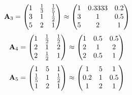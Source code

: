 \documentclass[10pt,a4paper]{article}
\begin{document}
	\[
		\bold{A}_{3} = 
		\begin{pmatrix}
			{1} {} & \frac{1} {{3}} & \frac{1} {{5}} \\
			{{3}} {} & {1} {} & \frac{1} {{2}} \\
			{{5}} {} & {{2}} {} & {1} {} \\
		\end{pmatrix}
		\approx
		\begin{pmatrix}
			1        & 0.3333   & 0.2      \\
			3        & 1        & 0.5      \\
			5        & 2        & 1        \\
		\end{pmatrix}
	\]
	\[
		\bold{A}_{4} = 
		\begin{pmatrix}
			{1} {} & \frac{1} {{2}} & \frac{1} {{2}} \\
			{{2}} {} & {1} {} & {{2}} {} \\
			{{2}} {} & \frac{1} {{2}} & {1} {} \\
		\end{pmatrix}
		\approx
		\begin{pmatrix}
			1        & 0.5      & 0.5      \\
			2        & 1        & 2        \\
			2        & 0.5      & 1        \\
		\end{pmatrix}
	\]
	\[
		\bold{A}_{5} = 
		\begin{pmatrix}
			{1} {} & {{5}} {} & {1} {} \\
			\frac{1} {{5}} & {1} {} & \frac{1} {{2}} \\
			{1} {} & {{2}} {} & {1} {} \\
		\end{pmatrix}
		\approx
		\begin{pmatrix}
			1        & 5        & 1        \\
			0.2      & 1        & 0.5      \\
			1        & 2        & 1        \\
		\end{pmatrix}
	\]
\end{document}
